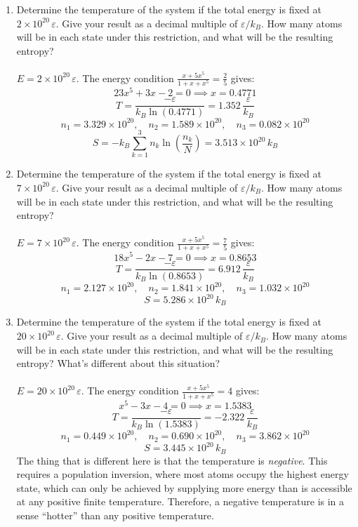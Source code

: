 \documentclass{article}
\begin{document}
\begin{enumerate}
\begin{enumerate}
            \item Determine the temperature of the system if the total energy is fixed at $2\times10^{20}\,\varepsilon$. Give your result as a decimal multiple of $\varepsilon/k_B$. How many atoms will be in each state under this restriction, and what will be the resulting entropy?
            \\
            \\$E = 2\times10^{20}\,\varepsilon$. The energy condition $\frac{x+5x^5}{1+x+x^5} = \frac{2}{5}$ gives:
            \[23x^5 + 3x - 2 = 0 \implies x = 0.4771\]
            \[T = \frac{-\varepsilon}{k_B\ln(0.4771)} = \boxed{1.352\,\frac{\varepsilon}{k_B}}\]
            \[n_1 = 3.329\times10^{20}, \quad n_2 = 1.589\times10^{20}, \quad n_3 = 0.082\times10^{20}\]
            \[S = -k_B\sum_{k=1}^3 n_k\ln\!\left(\frac{n_k}{N}\right) = \boxed{3.513\times10^{20}\,k_B}\]

            \item Determine the temperature of the system if the total energy is fixed at $7\times10^{20}\,\varepsilon$. Give your result as a decimal multiple of $\varepsilon/k_B$. How many atoms will be in each state under this restriction, and what will be the resulting entropy?
            \\
            \\$E = 7\times10^{20}\,\varepsilon$. The energy condition $\frac{x+5x^5}{1+x+x^5} = \frac{7}{5}$ gives:
            \[18x^5 - 2x - 7 = 0 \implies x = 0.8653\]
            \[T = \frac{-\varepsilon}{k_B\ln(0.8653)} = \boxed{6.912\,\frac{\varepsilon}{k_B}}\]
            \[n_1 = 2.127\times10^{20}, \quad n_2 = 1.841\times10^{20}, \quad n_3 = 1.032\times10^{20}\]
            \[S = \boxed{5.286\times10^{20}\,k_B}\]

            \item Determine the temperature of the system if the total energy is fixed at $20\times10^{20}\,\varepsilon$. Give your result as a decimal multiple of $\varepsilon/k_B$. How many atoms will be in each state under this restriction, and what will be the resulting entropy? What's different about this situation?
            \\
            \\$E = 20\times10^{20}\,\varepsilon$. The energy condition $\frac{x+5x^5}{1+x+x^5} = 4$ gives:
            \[x^5 - 3x - 4 = 0 \implies x = 1.5383\]
            \[T = \frac{-\varepsilon}{k_B\ln(1.5383)} = \boxed{-2.322\,\frac{\varepsilon}{k_B}}\]
            \[n_1 = 0.449\times10^{20}, \quad n_2 = 0.690\times10^{20}, \quad n_3 = 3.862\times10^{20}\]
            \[S = \boxed{3.445\times10^{20}\,k_B}\]
            The thing that is different here is that the temperature is \textit{negative}. This requires a population inversion, where most atoms occupy the highest energy state, which can only be achieved by supplying more energy than is accessible at any positive finite temperature. Therefore, a negative temperature is in a sense ``hotter'' than any positive temperature.


\end{enumerate}
\end{enumerate}
\end{document}

